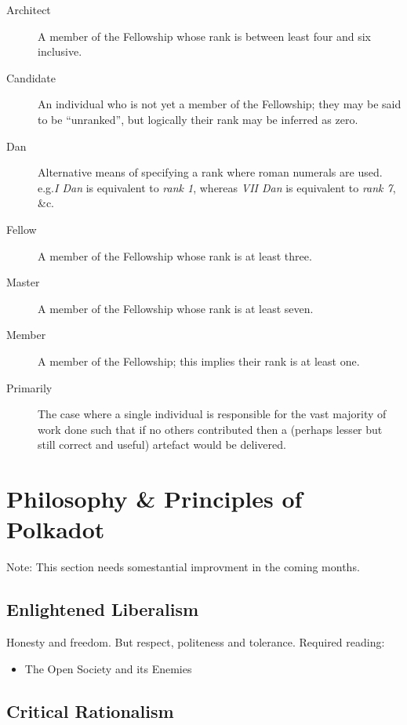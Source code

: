 \documentclass[9pt,oneside]{amsart}
\makeatletter
\newcommand*\Eg{e.g.\@\xspace}
\makeatother
\begin{document}
\begin{description}
  \item[Architect] A member of the Fellowship whose rank is between least four and six inclusive.
  \item[Candidate] An individual who is not yet a member of the Fellowship; they may be said to be ``unranked'', but logically their rank may be inferred as zero.
  \item[Dan] Alternative means of specifying a rank where roman numerals are used. \Eg \emph{I Dan} is equivalent to \emph{rank 1}, whereas \emph{VII Dan} is equivalent to \emph{rank 7}, \&c.
  \item[Fellow] A member of the Fellowship whose rank is at least three.
  \item[Master] A member of the Fellowship whose rank is at least seven.
  \item[Member] A member of the Fellowship; this implies their rank is at least one.
  \item[Primarily] The case where a single individual is responsible for the vast majority of work  done such that if no others contributed then a (perhaps lesser but still correct and useful) artefact would be delivered.
\end{description}

\section{Philosophy \& Principles of Polkadot}\label{philosophy-principles-of-polkadot}

Note: This section needs somestantial improvment in the coming months.

\subsection{Enlightened Liberalism}\label{enlightened-liberalism}

Honesty and freedom. But respect, politeness and tolerance. Required reading:

\begin{itemize}
\item
  The Open Society and its Enemies
\end{itemize}

\subsection{Critical Rationalism}\label{critical-rationalism}
\end{document}
